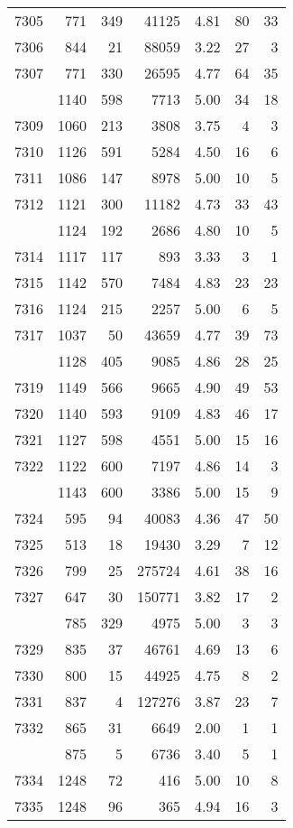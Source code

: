 \documentclass[
]{article}
\begin{document}
\begin{table}
\begin{tabular}[t]{lrrrrrr}
7305 & 771 & 349 & 41125 & 4.81 & 80 & 33\\
7306 & 844 & 21 & 88059 & 3.22 & 27 & 3\\
7307 & 771 & 330 & 26595 & 4.77 & 64 & 35\\
\addlinespace
7308 & 1140 & 598 & 7713 & 5.00 & 34 & 18\\
7309 & 1060 & 213 & 3808 & 3.75 & 4 & 3\\
7310 & 1126 & 591 & 5284 & 4.50 & 16 & 6\\
7311 & 1086 & 147 & 8978 & 5.00 & 10 & 5\\
7312 & 1121 & 300 & 11182 & 4.73 & 33 & 43\\
\addlinespace
7313 & 1124 & 192 & 2686 & 4.80 & 10 & 5\\
7314 & 1117 & 117 & 893 & 3.33 & 3 & 1\\
7315 & 1142 & 570 & 7484 & 4.83 & 23 & 23\\
7316 & 1124 & 215 & 2257 & 5.00 & 6 & 5\\
7317 & 1037 & 50 & 43659 & 4.77 & 39 & 73\\
\addlinespace
7318 & 1128 & 405 & 9085 & 4.86 & 28 & 25\\
7319 & 1149 & 566 & 9665 & 4.90 & 49 & 53\\
7320 & 1140 & 593 & 9109 & 4.83 & 46 & 17\\
7321 & 1127 & 598 & 4551 & 5.00 & 15 & 16\\
7322 & 1122 & 600 & 7197 & 4.86 & 14 & 3\\
\addlinespace
7323 & 1143 & 600 & 3386 & 5.00 & 15 & 9\\
7324 & 595 & 94 & 40083 & 4.36 & 47 & 50\\
7325 & 513 & 18 & 19430 & 3.29 & 7 & 12\\
7326 & 799 & 25 & 275724 & 4.61 & 38 & 16\\
7327 & 647 & 30 & 150771 & 3.82 & 17 & 2\\
\addlinespace
7328 & 785 & 329 & 4975 & 5.00 & 3 & 3\\
7329 & 835 & 37 & 46761 & 4.69 & 13 & 6\\
7330 & 800 & 15 & 44925 & 4.75 & 8 & 2\\
7331 & 837 & 4 & 127276 & 3.87 & 23 & 7\\
7332 & 865 & 31 & 6649 & 2.00 & 1 & 1\\
\addlinespace
7333 & 875 & 5 & 6736 & 3.40 & 5 & 1\\
7334 & 1248 & 72 & 416 & 5.00 & 10 & 8\\
7335 & 1248 & 96 & 365 & 4.94 & 16 & 3\\

\end{tabular}
\end{table}
\end{document}
